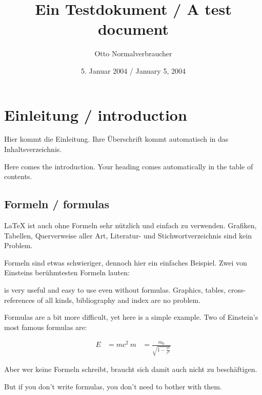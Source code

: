 \documentclass{article}
\title{Ein Testdokument / A test document}
\author{Otto Normalverbraucher}
\date{5. Januar 2004 / January 5, 2004}
\begin{document}
\maketitle



\tableofcontents



\section{Einleitung / introduction}


Hier kommt die Einleitung. Ihre Überschrift kommt
automatisch in das Inhaltsverzeichnis.




Here comes the introduction. Your heading comes
automatically in the table of contents.


\subsection{Formeln / formulas}






\LaTeX{}
 ist auch ohne Formeln sehr nützlich und
einfach zu verwenden. Grafiken, Tabellen,
Querverweise aller Art, Literatur- und
Stichwortverzeichnis sind kein Problem.

Formeln sind etwas schwieriger, dennoch hier ein
einfaches Beispiel. Zwei von Einsteins
berühmtesten Formeln lauten:

 is very useful and
easy to use even without formulas. Graphics, tables,
cross-references of all kinds, bibliography and
index are no problem.

Formulas are a bit more difficult, yet here is a
simple example. Two of Einstein's
most famous formulas are:

\begin{align}

E &= mc^2 

\
m &= \frac{m_0}{\sqrt{1-\frac{v^2}{c^2}}}

\end{align}

Aber wer keine Formeln schreibt, braucht sich
damit auch nicht zu beschäftigen.


But if you don't write formulas, you don't need
to bother with them.
\end{document}
